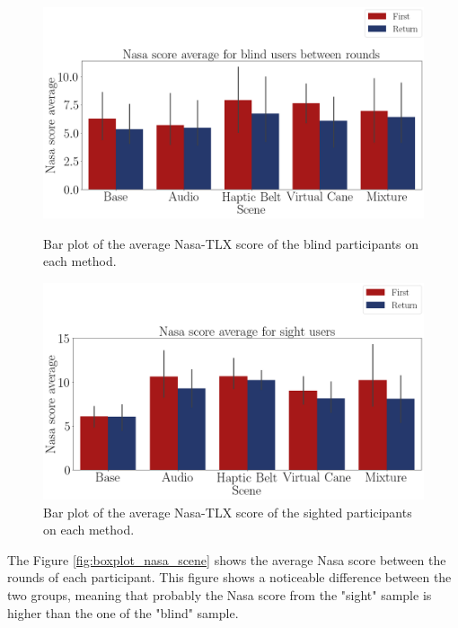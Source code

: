 \begin{figure}[!htb]
    \centering
    \begin{minipage}{\textwidth}
        \centering
        \includegraphics[width = 0.8\linewidth]{Resultados/Nasa/Figuras/png/barplot_nasa_avg_scene_blind.png}
        \caption{Bar plot of the average Nasa-TLX score of the blind participants on each method.}
        \label{fig:barplot_nasa_scene_blind}
    \end{minipage}
    \begin{minipage}{\textwidth}
        \centering
        \includegraphics[width = 0.8\linewidth]{Resultados/Nasa/Figuras/png/barplot_nasa_avg_scene_sight.png}
        \caption{Bar plot of the average Nasa-TLX score of the sighted participants on each method.}
        \label{fig:barplot_nasa_scene_sight}
    \end{minipage}
\end{figure}


The Figure \ref{fig:boxplot_nasa_scene} shows the average Nasa score between the rounds of each participant. This figure shows a noticeable difference between the two groups, meaning that probably the Nasa score from the "sight" sample is higher than the one of the "blind" sample.

